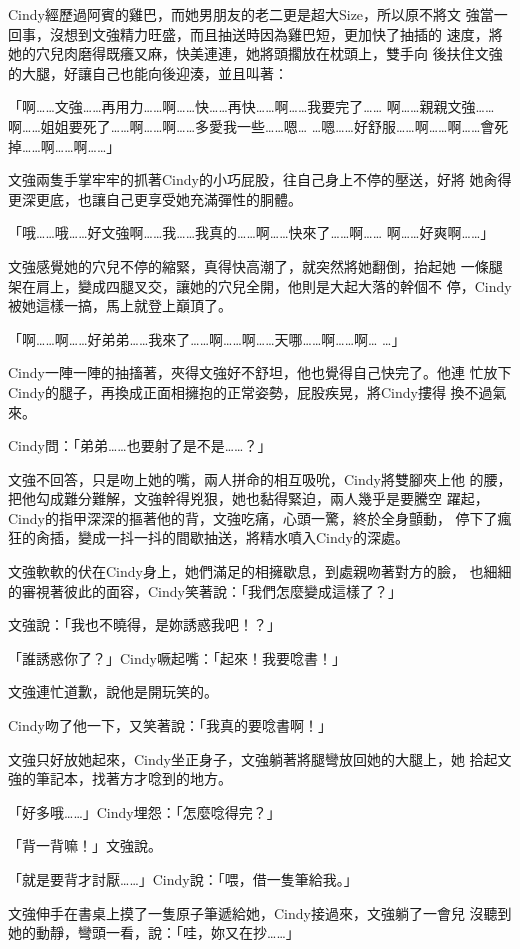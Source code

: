 Cindy經歷過阿賓的雞巴，而她男朋友的老二更是超大Size，所以原不將文
強當一回事，沒想到文強精力旺盛，而且抽送時因為雞巴短，更加快了抽插的
速度，將她的穴兒肉磨得既癢又麻，快美連連，她將頭擱放在枕頭上，雙手向
後扶住文強的大腿，好讓自己也能向後迎湊，並且叫著：

「啊……文強……再用力……啊……快……再快……啊……我要完了……
啊……親親文強……啊……姐姐要死了……啊……啊……多愛我一些……嗯…
…嗯……好舒服……啊……啊……會死掉……啊……啊……」

文強兩隻手掌牢牢的抓著Cindy的小巧屁股，往自己身上不停的壓送，好將
她肏得更深更底，也讓自己更享受她充滿彈性的胴體。

「哦……哦……好文強啊……我……我真的……啊……快來了……啊……
啊……好爽啊……」

文強感覺她的穴兒不停的縮緊，真得快高潮了，就突然將她翻倒，抬起她
一條腿架在肩上，變成四腿叉交，讓她的穴兒全開，他則是大起大落的幹個不
停，Cindy被她這樣一搞，馬上就登上巔頂了。

「啊……啊……好弟弟……我來了……啊……啊……天哪……啊……啊…
…」

Cindy一陣一陣的抽搐著，夾得文強好不舒坦，他也覺得自己快完了。他連
忙放下Cindy的腿子，再換成正面相擁抱的正常姿勢，屁股疾晃，將Cindy摟得
換不過氣來。

Cindy問：「弟弟……也要射了是不是……？」

文強不回答，只是吻上她的嘴，兩人拼命的相互吸吮，Cindy將雙腳夾上他
的腰，把他勾成難分難解，文強幹得兇狠，她也黏得緊迫，兩人幾乎是要騰空
躍起，Cindy的指甲深深的摳著他的背，文強吃痛，心頭一驚，終於全身顫動，
停下了瘋狂的肏插，變成一抖一抖的間歇抽送，將精水噴入Cindy的深處。

文強軟軟的伏在Cindy身上，她們滿足的相擁歇息，到處親吻著對方的臉，
也細細的審視著彼此的面容，Cindy笑著說：「我們怎麼變成這樣了？」

文強說：「我也不曉得，是妳誘惑我吧！？」

「誰誘惑你了？」Cindy噘起嘴：「起來！我要唸書！」

文強連忙道歉，說他是開玩笑的。

Cindy吻了他一下，又笑著說：「我真的要唸書啊！」

文強只好放她起來，Cindy坐正身子，文強躺著將腿彎放回她的大腿上，她
拾起文強的筆記本，找著方才唸到的地方。

「好多哦……」Cindy埋怨：「怎麼唸得完？」

「背一背嘛！」文強說。

「就是要背才討厭……」Cindy說：「喂，借一隻筆給我。」

文強伸手在書桌上摸了一隻原子筆遞給她，Cindy接過來，文強躺了一會兒
沒聽到她的動靜，彎頭一看，說：「哇，妳又在抄……」

